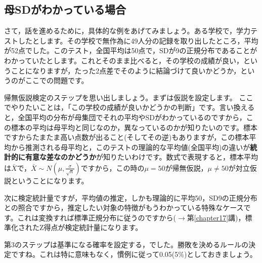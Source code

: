 \documentclass{ltjsbook}
\begin{document}
\subsection{母SDがわかっている場合}

さて，話を進めるために，具体的な例をあげてみましょう。ある学校で，学力テストしたとします。その学校で無作為に49人分の記録を取り出したところ，平均が52点でした。このテスト，全国平均は50点で，SDが9の正規分布であることがわかっていたとします。これとそのまま比べると，その学校の成績が良い，ということになりますが，たった2点差でそのように結論づけて良いかどうか，というのがここでの問題です。

帰無仮説検定のステップを思い出しましょう。まずは仮説を設定します。
ここでやりたいことは，「この学校の成績が良いかどうかの判断」です。言い換えると，全国平均の分布が母集団でそれの平均やSDがわかっているのですから，この標本の平均は母平均と同じなのか，異なっているのかが知りたいのです。標本ですからたまたま高い点数が出ること(そしてその逆)もありますが，この標本平均から推測される母平均と，このテストの理論的な平均値(全国平均)の違いが\textbf{統計的に有意な差なのかどうか}が知りたいわけです。数式で表現すると，標本平均は$\bar{X}$で，$\bar{X} \sim N(\mu, \frac{\sigma}{\sqrt{n}})$ですから，この時の$\mu=50$が帰無仮説，$\mu \neq 50$が対立仮説ということになります。

次に検定統計量ですが，平均値の推定，しかも理論的に平均50，SD9の正規分布との照合ですから，推定したい対象の特徴がもうわかっている特殊なケースです。これは変換すれば標準正規分布に従うのですから($\to$第\ref{chapter17}講)，標準化されたZ得点が検定統計量になります。

第3のステップは基準になる確率を設定する，でした。勝敗を決めるルールの決定ですね。これは特に意味もなく，慣例に従って0.05(5\%)としておきましょう。
\end{document}

